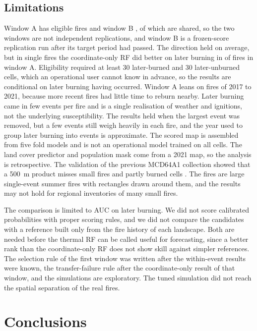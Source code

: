 \documentclass[preprint,12pt,authoryear]{elsarticle}
\begin{document}
\subsection{Limitations}
\label{sec:disc-limits}

Window A has \sAElig{} eligible fires and window B \sBElig, of which \sBOverlap{} are shared, so the two windows are not independent replications, and window B is a frozen-score replication run after its target period had passed. The direction held on average, but in single fires the coordinate-only RF did better on later burning in \sACrfCoordBetter{} of \sAElig{} fires in window A. Eligibility required at least 30 later-burned and 30 later-unburned cells, which an operational user cannot know in advance, so the results are conditional on later burning having occurred. Window A leans on fires of 2017 to 2021, because more recent fires had little time to reburn nearby. Later burning came in few events per fire and is a single realisation of weather and ignitions, not the underlying susceptibility. The results held when the largest event was removed, but a few events still weigh heavily in each fire, and the year used to group later burning into events is approximate. The scored map is assembled from five fold models and is not an operational model trained on all cells. The land cover predictor and population mask come from a 2021 map, so the analysis is retrospective. The validation of the previous MCD64A1 collection showed that a 500~m product misses small fires and partly burned cells \citep{Boschetti2019}. The fires are large single-event summer fires with rectangles drawn around them, and the results may not hold for regional inventories of many small fires.

The comparison is limited to AUC on later burning. We did not score calibrated probabilities with proper scoring rules, and we did not compare the candidates with a reference built only from the fire history of each landscape. Both are needed before the thermal RF can be called useful for forecasting, since a better rank than the coordinate-only RF does not show skill against simpler references. The selection rule of the first window was written after the within-event results were known, the transfer-failure rule after the coordinate-only result of that window, and the simulations are exploratory. The tuned simulation did not reach the spatial separation of the real fires.

\section{Conclusions}
\label{sec:conclusions}
\end{document}
